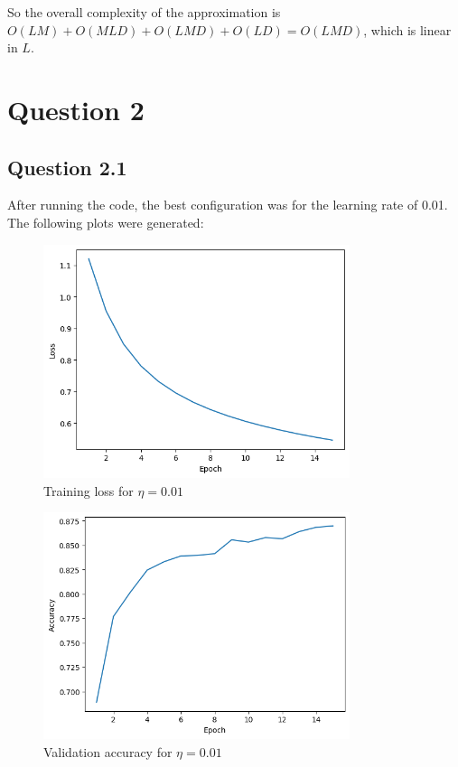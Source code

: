 \documentclass{article}
\begin{document}
\bigskip

So the overall complexity of the approximation is $O(L M) + O(M L D) + O(L M D) + O(L D) = O(L M D)$, which is linear in $L$.

\section{Question 2}

\subsection{Question 2.1}
After running the code, the best configuration was for the learning rate of 0.01.
The following plots were generated:

\begin{figure}[H]
    \centering
    \includegraphics[width=0.8\textwidth]{plots/CNN-training-loss-0.01-0.7-0-sgd-False.png}
    \caption{Training loss for $\eta=0.01$}
    \label{fig:2.1-training_loss}
\end{figure}

\begin{figure}[H]
    \centering
    \includegraphics[width=0.8\textwidth]{plots/CNN-validation-accuracy-0.01-0.7-0-sgd-False.png}
    \caption{Validation accuracy for $\eta=0.01$}
    \label{fig:2.1-validation_accuracy}
\end{figure}
\end{document}
